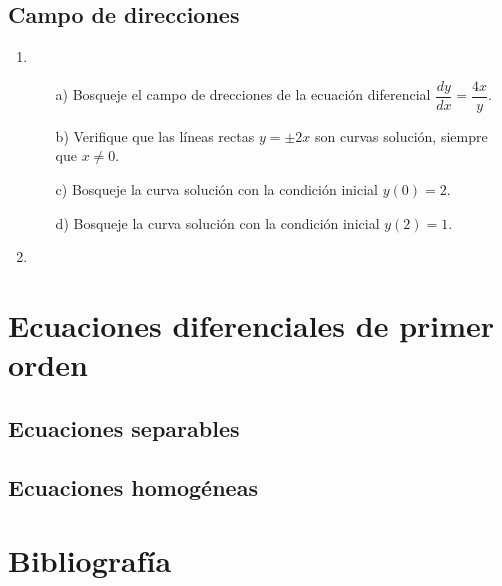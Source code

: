 \documentclass[12pt]{article}
\theoremstyle{definition}
\begin{document}
\subsection{Campo de direcciones}

\begin{enumerate}
 \item  \begin{itemize}
  \item  [a)] Bosqueje el campo de drecciones de la ecuación diferencial $\dfrac{dy}{dx}=\dfrac{4x}{y}$. 
  \item [b)] Verifique que las líneas rectas $y=\pm 2x$ son 
  curvas solución, siempre que $x\neq 0$. 
  \item [c)] Bosqueje la curva solución con la condición inicial $y(0)=2$. 
  \item [d)] Bosqueje la curva solución con la  condición inicial $y(2)=1$.
 \end{itemize}
 
 \item 
 \end{enumerate}

\section{Ecuaciones diferenciales de primer orden}

\subsection{Ecuaciones separables}

\subsection{Ecuaciones homogéneas}

\newpage

\section{Bibliografía}
\end{document}
